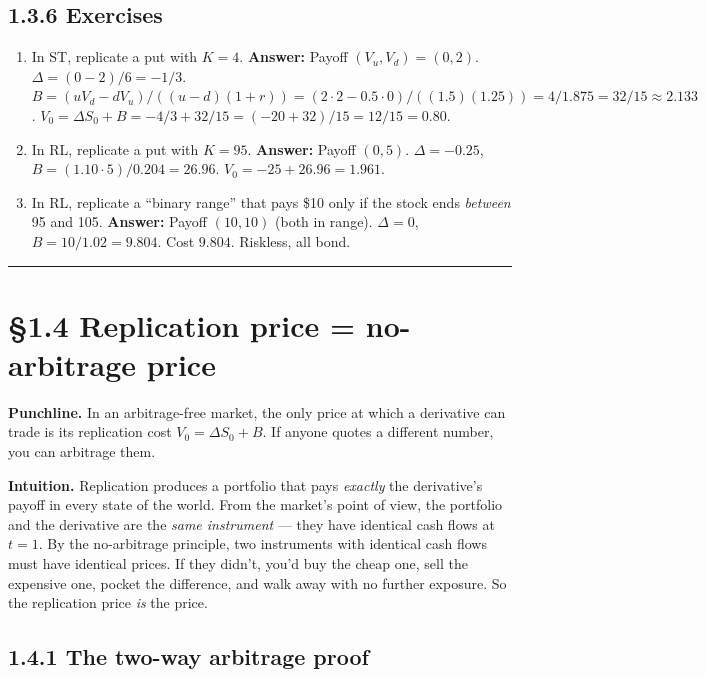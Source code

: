 \documentclass[
  10pt,
  twoside]{book}
\providecommand{\tightlist}{%
  \setlength{\itemsep}{0pt}\setlength{\parskip}{0pt}}
\begin{document}
\subsection{1.3.6 Exercises}\label{exercises-13}

\begin{enumerate}
\def\labelenumi{\arabic{enumi}.}
\tightlist
\item
  In ST, replicate a put with \(K=4\). \textbf{Answer:} Payoff
  \((V_u,V_d)=(0,2)\). \(\Delta=(0-2)/6=-1/3\).
  \(B=(u V_d-d V_u)/((u-d)(1+r))=(2\cdot 2-0.5\cdot 0)/((1.5)(1.25))=4/1.875=32/15\approx 2.133\).
  \(V_0=\Delta S_0+B=-4/3+32/15=(-20+32)/15=12/15=0.80\).
\item
  In RL, replicate a put with \(K=95\). \textbf{Answer:} Payoff
  \((0,5)\). \(\Delta=-0.25\), \(B=(1.10\cdot 5)/0.204=26.96\).
  \(V_0=-25+26.96=1.961\).
\item
  In RL, replicate a ``binary range'' that pays \$10 only if the stock
  ends \emph{between} 95 and 105. \textbf{Answer:} Payoff \((10,10)\)
  (both in range). \(\Delta=0\), \(B=10/1.02=9.804\). Cost \(9.804\).
  Riskless, all bond.
\end{enumerate}

\begin{center}\rule{0.5\linewidth}{0.5pt}\end{center}

\section{§1.4 Replication price = no-arbitrage
price}\label{replication-price-no-arbitrage-price}

\textbf{Punchline.} In an arbitrage-free market, the only price at which
a derivative can trade is its replication cost \(V_0=\Delta S_0+B\). If
anyone quotes a different number, you can arbitrage them.

\textbf{Intuition.} Replication produces a portfolio that pays
\emph{exactly} the derivative's payoff in every state of the world. From
the market's point of view, the portfolio and the derivative are the
\emph{same instrument} --- they have identical cash flows at \(t=1\). By
the no-arbitrage principle, two instruments with identical cash flows
must have identical prices. If they didn't, you'd buy the cheap one,
sell the expensive one, pocket the difference, and walk away with no
further exposure. So the replication price \emph{is} the price.

\subsection{1.4.1 The two-way arbitrage
proof}\label{the-two-way-arbitrage-proof}
\end{document}
